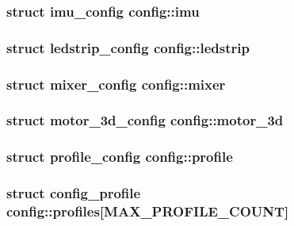 \hypertarget{structconfig_ac94ca563236e07d70f1e128cb9f060d1}{
\subsubsection[{imu}]{\setlength{\rightskip}{0pt plus 5cm}struct {\bf imu\+\_\+config} config\+::imu}}\label{structconfig_ac94ca563236e07d70f1e128cb9f060d1}
\hypertarget{structconfig_a48d5a00547ae550bb3e0520e101c236c}{
\subsubsection[{ledstrip}]{\setlength{\rightskip}{0pt plus 5cm}struct {\bf ledstrip\+\_\+config} config\+::ledstrip}}\label{structconfig_a48d5a00547ae550bb3e0520e101c236c}
\hypertarget{structconfig_a7f3516dcc2e43f74eccc8fe4ab25f711}{
\subsubsection[{mixer}]{\setlength{\rightskip}{0pt plus 5cm}struct {\bf mixer\+\_\+config} config\+::mixer}}\label{structconfig_a7f3516dcc2e43f74eccc8fe4ab25f711}
\hypertarget{structconfig_a0210c2694683d31fe6116fd5fe91de94}{
\subsubsection[{motor\+\_\+3d}]{\setlength{\rightskip}{0pt plus 5cm}struct {\bf motor\+\_\+3d\+\_\+config} config\+::motor\+\_\+3d}}\label{structconfig_a0210c2694683d31fe6116fd5fe91de94}
\hypertarget{structconfig_abde2854d55ccbbf03e3e308adba984f9}{
\subsubsection[{profile}]{\setlength{\rightskip}{0pt plus 5cm}struct {\bf profile\+\_\+config} config\+::profile}}\label{structconfig_abde2854d55ccbbf03e3e308adba984f9}
\hypertarget{structconfig_a4cea9f922bb1e0bea95d87c9b006dfff}{
\subsubsection[{profiles}]{\setlength{\rightskip}{0pt plus 5cm}struct {\bf config\+\_\+profile} config\+::profiles\mbox{[}{\bf M\+A\+X\+\_\+\+P\+R\+O\+F\+I\+L\+E\+\_\+\+C\+O\+U\+N\+T}\mbox{]}}}\label{structconfig_a4cea9f922bb1e0bea95d87c9b006dfff}
